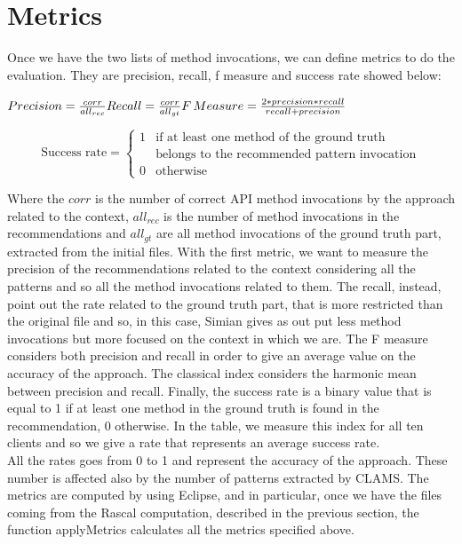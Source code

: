 \section{Metrics}
Once we have the two lists of method invocations, we can define metrics to do the evaluation. They are precision, recall,  f measure and success rate showed below:\\


\begingroup

\fontsize{15pt}{24pt}\selectfont
\noindent
$ Precision =  \frac{corr}{all_{rec}}\\  
\\
Recall  = \frac{corr}{all_{gt}} \\  
\\
F\,Measure =\frac{2*precision*recall}{recall+precision}\\
$

\begin{equation}
 \text{Success rate} =
    \begin{cases}
      1 & \text{if at least one method of the ground truth }\\
      & \text{belongs to the recommended pattern invocation}\\      
      0 & \text{otherwise}
    \end{cases}       
\end{equation}

\endgroup



Where the $corr$ is the number of correct API method invocations by the approach related to the context, $all_{rec}$ is the number of method invocations in the recommendations and $all_{gt}$ are all method invocations of the ground truth part, extracted from the initial files. With the first metric, we want to measure the precision of the recommendations related to the context considering all the patterns and so all the method invocations related to them. The recall, instead, point out the rate related to the ground truth part, that is more restricted than the original file and so, in this case, Simian gives as out put less method invocations but more focused on the context in which we are. The F measure considers both precision and recall in order to give an average value on the accuracy of the approach. The classical index considers the harmonic mean between precision and recall. Finally, the success rate is a binary value that is equal to 1 if at least one method in the ground truth is found in the recommendation, 0 otherwise. In the table, we measure this index for all ten clients and so we give a rate that represents an average success rate.\\
All the rates goes from 0 to 1 and represent the accuracy of the approach. These number is affected also by the number of patterns extracted by CLAMS. The metrics are computed by using Eclipse, and in particular, once we have the files coming from the Rascal computation, described in the previous section, the function applyMetrics calculates all the metrics specified above.

